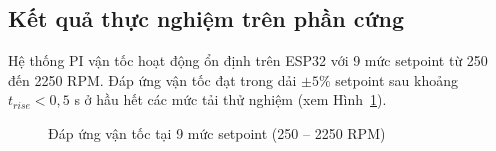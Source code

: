 \subsection{Kết quả thực nghiệm trên phần cứng}

Hệ thống PI vận tốc hoạt động ổn định trên ESP32 với 9 mức setpoint từ 250 đến
2250 RPM. Đáp ứng vận tốc đạt trong dải $\pm 5\%$ setpoint sau khoảng
$t_{rise} < 0{,}5$ s ở hầu hết các mức tải thử nghiệm
(xem Hình~\ref{fig:velocity_response}).

\begin{figure}[H]
    \centering
    \caption{Đáp ứng vận tốc tại 9 mức setpoint (250 -- 2250 RPM)}
    \label{fig:velocity_response}
\end{figure}
